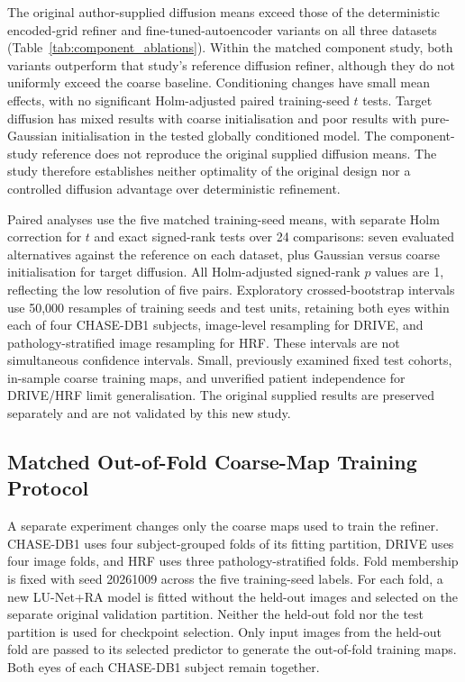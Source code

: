 \documentclass[jimaging,article,submit,pdftex,moreauthors]{Definitions/mdpi}%
\begin{document}
The original author-supplied diffusion means exceed those of the deterministic encoded-grid refiner and fine-tuned-autoencoder variants on all three datasets (Table~\ref{tab:component_ablations}). Within the matched component study, both variants outperform that study's reference diffusion refiner, although they do not uniformly exceed the coarse baseline. Conditioning changes have small mean effects, with no significant Holm-adjusted paired training-seed $t$ tests. Target diffusion has mixed results with coarse initialisation and poor results with pure-Gaussian initialisation in the tested globally conditioned model. The component-study reference does not reproduce the original supplied diffusion means. The study therefore establishes neither optimality of the original design nor a controlled diffusion advantage over deterministic refinement.

Paired analyses use the five matched training-seed means, with separate Holm correction for $t$ and exact signed-rank tests over 24 comparisons: seven evaluated alternatives against the reference on each dataset, plus Gaussian versus coarse initialisation for target diffusion. All Holm-adjusted signed-rank $p$ values are 1, reflecting the low resolution of five pairs. Exploratory crossed-bootstrap intervals use 50,000 resamples of training seeds and test units, retaining both eyes within each of four CHASE-DB1 subjects, image-level resampling for DRIVE, and pathology-stratified image resampling for HRF. These intervals are not simultaneous confidence intervals. Small, previously examined fixed test cohorts, in-sample coarse training maps, and unverified patient independence for DRIVE/HRF limit generalisation. The original supplied results are preserved separately and are not validated by this new study.


\subsection{Matched Out-of-Fold Coarse-Map Training Protocol}
\label{sec:oof_protocol}

A separate experiment changes only the coarse maps used to train the refiner. CHASE-DB1 uses four subject-grouped folds of its fitting partition, DRIVE uses four image folds, and HRF uses three pathology-stratified folds. Fold membership is fixed with seed 20261009 across the five training-seed labels. For each fold, a new LU-Net+RA model is fitted without the held-out images and selected on the separate original validation partition. Neither the held-out fold nor the test partition is used for checkpoint selection. Only input images from the held-out fold are passed to its selected predictor to generate the out-of-fold training maps. Both eyes of each CHASE-DB1 subject remain together.
\end{document}
